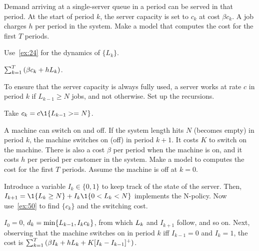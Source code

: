 \begin{exercise}\label{ex:l-116}
Demand 
arriving at a single-server queue in a period can be served in that period.
At the start of  period $k$, the server capacity is set to $c_k$ at cost $\beta c_k$. 
A job charges $h$ per period in the  system.
Make a  model that computes the cost for the first $T$ periods. 
\begin{hint}
  Use~\cref{ex:24} for the dynamics of $\{L_k\}$. 
\end{hint}
\begin{solution} $\sum_{k=1}^T \left(\beta c_k + h L_k\right)$.
\end{solution}
\end{exercise}


\begin{exercise}\label{ex:50}
To ensure that the server capacity is always fully used, 
a server  works at rate $c$ in period $k$  if $L_{k-1}\geq N$ jobs, and not otherwise.
Set up the recursions.
\begin{solution}
Take $c_k = c\1{\L_{k-1} >= N}$.
\end{solution}
\end{exercise}


\begin{exercise}\label{ex:n-policies}
A machine  can switch on and off.
 If the system length hits $N$ (becomes empty) in period $k$, the machine switches on (off) in period $k+1$.
 It costs $K$ to switch on the machine.
 There is also a cost $\beta$ per period when the machine is on, and it costs $h$ per period per customer in the system.
Make a  model to  computes the cost for the first $T$ periods.
Assume the machine is  off at $k=0$.
\begin{hint}
  Introduce a variable $I_k\in\{0, 1\}$ to keep track of the state of the server.
  Then, $I_{k+1} = \1{\L_k\geq N} + I_k \1{0<\L_k<N}$ implements the N-policy.
  Now use~\cref{ex:50} to find $\{c_k\}$ and the switching cost.
\end{hint}
\begin{solution}
$I_0 = 0$,  $d_k =\min\{L_{k-1}, I_k c_k\}$, from which
$L_k$ and $I_{k+1}$ follow, and so on. Next, 
 observing that the machine  switches on in period $k$ iff
$I_{k-1} = 0$ and $I_k=1$, the cost is $\sum_{k=1}^T \left(\beta I_k + h L_k + K[I_k - I_{k-1}]^+\right)$.
\end{solution}
\end{exercise}


